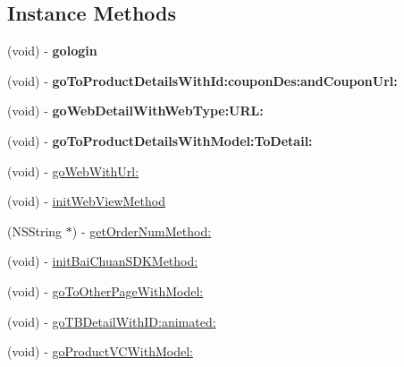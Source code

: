 \subsection*{Instance Methods}
\begin{DoxyCompactItemize}
\item 
\mbox{\label{interface_super_view_controller_af4abc41a958ad930b4dd744921660d5f}} 
(void) -\/ {\bfseries gologin}
\item 
\mbox{\label{interface_super_view_controller_aff42bebc29901d2aea332774845b81c3}} 
(void) -\/ {\bfseries go\+To\+Product\+Details\+With\+Id\+:coupon\+Des\+:and\+Coupon\+Url\+:}
\item 
\mbox{\label{interface_super_view_controller_a4d857006acf19dff98866968b10fd8e2}} 
(void) -\/ {\bfseries go\+Web\+Detail\+With\+Web\+Type\+:\+U\+R\+L\+:}
\item 
\mbox{\label{interface_super_view_controller_afbb91008343faf936c6e1094f763975d}} 
(void) -\/ {\bfseries go\+To\+Product\+Details\+With\+Model\+:\+To\+Detail\+:}
\item 
(void) -\/ \mbox{\hyperlink{interface_super_view_controller_a8160c01dd45f478af7622edc455c5d7e}{go\+Web\+With\+Url\+:}}
\item 
(void) -\/ \mbox{\hyperlink{interface_super_view_controller_a63c776a89d192c745618d2e9a5eca8dd}{init\+Web\+View\+Method}}
\item 
(N\+S\+String $\ast$) -\/ \mbox{\hyperlink{interface_super_view_controller_ab7ab42f58cf10f67de0318b9836fff1a}{get\+Order\+Num\+Method\+:}}
\item 
(void) -\/ \mbox{\hyperlink{interface_super_view_controller_aa12abbb1b1182a2b878e2faaffb3b5a4}{init\+Bai\+Chuan\+S\+D\+K\+Method\+:}}
\item 
(void) -\/ \mbox{\hyperlink{interface_super_view_controller_a3ad11692826d442ca019a3d84cac3366}{go\+To\+Other\+Page\+With\+Model\+:}}
\item 
(void) -\/ \mbox{\hyperlink{interface_super_view_controller_a5b008f8c6991f8323ebedfb05960940f}{go\+T\+B\+Detail\+With\+I\+D\+:animated\+:}}
\item 
(void) -\/ \mbox{\hyperlink{interface_super_view_controller_acb4e54c12740e092cfd97c5295238c5a}{go\+Product\+V\+C\+With\+Model\+:}}

\end{DoxyCompactItemize}
